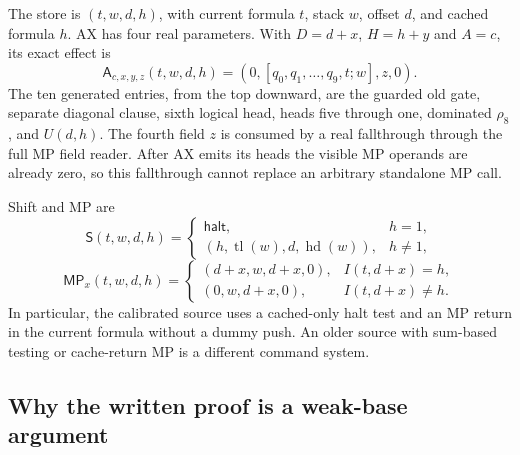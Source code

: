 The store is $(t,w,d,h)$, with current formula $t$, stack $w$, offset $d$,
and cached formula $h$.  AX has four real parameters.  With $D=d+x$, $H=h+y$
and $A=c$, its exact effect is
\[
 \mathsf A_{c,x,y,z}(t,w,d,h)
   =(0,[q_0,q_1,\ldots,q_9,t;w],z,0).
\]
The ten generated entries, from the top downward, are the guarded old gate,
separate diagonal clause, sixth logical head, heads five through one,
dominated $\rho_8$, and $U(d,h)$.  The fourth field $z$ is consumed by a
real fallthrough through the full MP field reader.  After AX emits its
heads the visible MP operands are already zero, so this fallthrough cannot
replace an arbitrary standalone MP call.

Shift and MP are
\[
 \mathsf S(t,w,d,h)=
 \begin{cases}
  \mathsf{halt},&h=1,\\
  (h,\operatorname{tl}(w),d,\operatorname{hd}(w)),&h\ne1,
 \end{cases}
\]
\[
 \mathsf{MP}_x(t,w,d,h)=
 \begin{cases}
   (d+x,w,d+x,0),&I(t,d+x)=h,\\
   (0,w,d+x,0),&I(t,d+x)\ne h.
 \end{cases}
\]
In particular, the calibrated source uses a cached-only halt test and an MP
return in the current formula without a dummy push.  An older source with
sum-based testing or cache-return MP is a different command system.

\subsection{Why the written proof is a weak-base argument}

